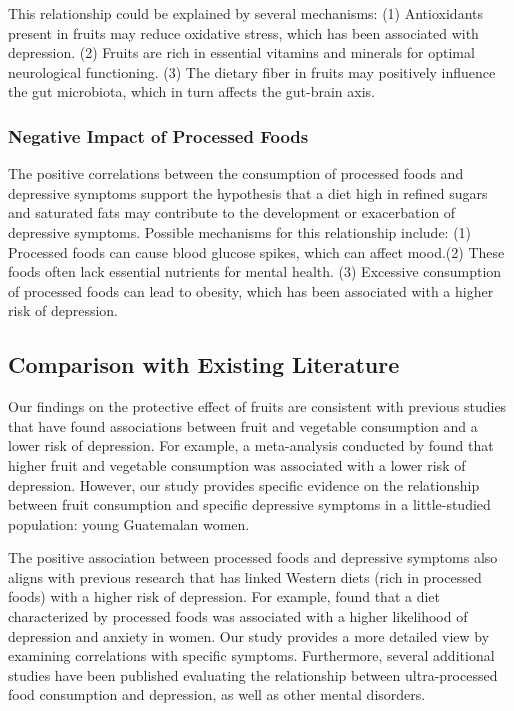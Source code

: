 \documentclass[jou]{apa7}
\begin{document}
This relationship could be explained by several mechanisms: (1) Antioxidants present in fruits may reduce oxidative stress, which has been associated with depression. (2) Fruits are rich in essential vitamins and minerals for optimal neurological functioning. (3) The dietary fiber in fruits may positively influence the gut microbiota, which in turn affects the gut-brain axis.

\subsubsection{Negative Impact of Processed Foods}\label{impacto-negativo-de-alimentos-procesados}

The positive correlations between the consumption of processed foods and depressive symptoms support the hypothesis that a diet high in refined sugars and saturated fats may contribute to the development or exacerbation of depressive symptoms. Possible mechanisms for this relationship include: (1) Processed foods can cause blood glucose spikes, which can affect mood.(2) These foods often lack essential nutrients for mental health. (3) Excessive consumption of processed foods can lead to obesity, which has been associated with a higher risk of depression.


\subsection{Comparison with Existing Literature}\label{comparison-with-existing-literature}

Our findings on the protective effect of fruits are consistent with previous studies that have found associations between fruit and vegetable consumption and a lower risk of depression. For example, a meta-analysis conducted by \parencite{liuFruitVegetableConsumption2016} found that higher fruit and vegetable consumption was associated with a lower risk of depression. However, our study provides specific evidence on the relationship between fruit consumption and specific depressive symptoms in a little-studied population: young Guatemalan women.

The positive association between processed foods and depressive symptoms also aligns with previous research that has linked Western diets (rich in processed foods) with a higher risk of depression. For example, \parencite{laneUltraProcessedFoodConsumption2022} found that a diet characterized by processed foods was associated with a higher likelihood of depression and anxiety in women. Our study provides a more detailed view by examining correlations with specific symptoms. Furthermore, several additional studies have been published evaluating the relationship between ultra-processed food consumption and depression, as well as other mental disorders. 
\end{document}

